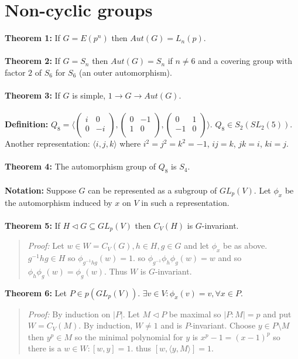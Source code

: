 \section {Non-cyclic groups}
{\bf Theorem 1:}
If $G= E(p^n)$ then $Aut(G)= L_n(p)$.
\\
\\
{\bf Theorem 2:}
If $G= S_n$ then $Aut(G)= S_n$ if $n \ne 6$ and a covering group with factor $2$ of $S_6$ for
$S_6$ (an outer automorphism).
\\
\\
{\bf Theorem 3:}
If $G$ is simple, $1 \rightarrow G \rightarrow Aut(G)$.
\\
\\
{\bf Definition:} $Q_8 =
\langle
\left(\begin{array} {cc}
i & 0\\
0 & -i\\
\end{array}\right),
\left(\begin{array} {cc}
0 & -1\\
1 & 0\\
\end{array}\right),
\left(\begin{array} {cc}
0 & 1\\
-1 & 0\\
\end{array}\right)
\rangle$. $Q_8 \in S_2(SL_2(5))$.  Another representation: $\langle i, j, k \rangle$ where $i^2 = j^2 = k^2 = -1$, $ij = k$,
$jk=i$, $ki=j$.
\\
\\
{\bf Theorem 4:}  The automorphism group of $Q_8$ is $S_4$.
\\
\\
{\bf Notation:} Suppose $G$ can be represented as a subgroup of $GL_p(V)$.
Let $\phi_{x}$ be the automorphism induced by $x$ on $V$ in such a representation.
\\
\\
{\bf Theorem 5:} If $H \lhd G \subseteq GL_p(V)$ then $C_V(H)$ is $G$-invariant.
\begin{quote}
\emph{Proof:}
Let $w \in W = C_V(G), h \in H, g \in G$ and let $\phi_{x}$ be as above.
$g^{-1} h g \in H$ so $\phi_{g^{-1} h g}(w) = 1$.
so $\phi_{g^{-1}} \phi_{h} \phi_{g} (w) = w$ and so $\phi_{h} \phi_{g} (w) = \phi_{g} (w)$.
Thus $W$ is $G$-invariant.
\end{quote}
{\bf Theorem 6:} Let $P \in p(GL_p(V))$.  $\exists v \in V: \phi_{x}(v)= v, \forall x \in P$.
\begin{quote}
\emph{Proof:}
By induction on $|P|$.  Let $M \lhd P$ be maximal so $|P:M|=p$ and put $W=C_V(M)$.
By induction, $W \ne 1$ and is $P$-invariant.  Choose $y \in P \setminus M$ then
$y^p \in M$ so the minimal polynomial for $y$ is $x^p-1 = (x-1)^p$ so there is a $w \in W: [w,y]=1$.
thus $[w, \langle y, M \rangle ] = 1$.
\end{quote}
